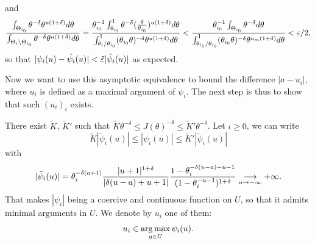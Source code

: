     and
        \begin{equation}
            \frac{\int_{\Theta_{i_0}} \theta^{-\delta}\theta^{u(1+\delta)}  d\theta}{\int_{\Theta_{i}\setminus\Theta_{i_0} } \theta^{-\delta }\theta^{u(1+\delta)}d\theta }
            = 
            \frac{\theta_{i_0}^{-1}\int_{\theta_{i_0}}^1 \theta^{-\delta}(\frac{\theta}{\theta_{i_0}})^{u(1+\delta)}  d\theta}{\int_{\theta_{i}/\theta_{i_0}}^1 (\theta_{i_0}\theta)^{-\delta }\theta^{u(1+\delta)} d\theta } %
            < \frac{\theta_{i_0}^{-1}\int_{\Theta_{i_0} }\theta^{-\delta} d\theta}{\int_{\theta_{i_1}/\theta_{i_0} }^1 (\theta_{i_0}\theta)^{-\delta }\theta^{u_m(1+\delta)}d\theta} < \eps/2,
        \end{equation}
    so that $|\psi_i(u)-\tilde\psi_i(u)|<\tilde{\varepsilon}|\tilde\psi_i(u)|$ as expected. %

    Now we want to use this asymptotic equivalence to bound the difference $|a-u_i|$, where $u_i$ is defined as a maximal argument of $\psi_i$. The next step is thus to show that such $(u_i)_i$ exists.
    
    There exist $\tilde K$, $\tilde K'$ such that $\tilde K\theta^{-\delta}\leq J(\theta)^{-\delta}\leq \tilde K'\theta^{-\delta}$. 
    Let $i\geq0$, we can write
        \begin{equation}\label{eq:gendarmeJeffreys}
            \tilde K |\tilde\psi_i(u)| \leq|\psi_i(u)| \leq \tilde K'|\tilde\psi_i(u)|
        \end{equation}
    with 
        \begin{equation}
            |\tilde\psi_i(u)| = \theta_i^{-\delta(a+1)}\frac{|u+1|^{1+\delta}}{|\delta(u-a)+u+1|}\frac{1-\theta_i^{-\delta(u-a)-u-1}}{(1-\theta_i^{-u-1})^{1+\delta}}  \overset{\ }{\underset{u\rightarrow-\infty}{\longrightarrow}}+\infty.
        \end{equation}
    That makes $|\psi_i|$ being a coercive and continuous function on $U$, so that it admits minimal arguments in $U$. We denote by $u_i$ one of them: 
        \begin{equation}
            u_i \in \operatorname*{arg\,max}_{u\in U} \psi_i(u).
        \end{equation}


